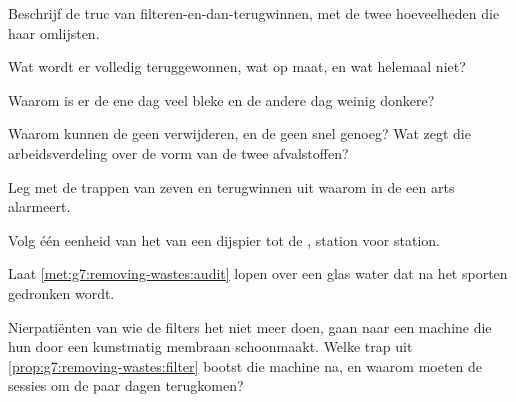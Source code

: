 \begin{exercise}[$\star$]\label{exo:g7:removing-wastes:4}
Beschrijf de truc van filteren-en-dan-terugwinnen, met de twee
hoeveelheden die haar omlijsten.
\end{exercise}

\begin{exercise}[$\star$]\label{exo:g7:removing-wastes:5}
Wat wordt er volledig teruggewonnen, wat op maat, en wat helemaal niet?
\end{exercise}

\begin{exercise}[$\star$]\label{exo:g7:removing-wastes:6}
Waarom is er de ene dag veel bleke  en de andere dag weinig donkere?
\end{exercise}

\begin{exercise}[$\star\star$]\label{exo:g7:removing-wastes:7}
Waarom kunnen de  geen  verwijderen, en de  geen
 snel genoeg? Wat zegt die arbeidsverdeling over de vorm
van de twee afvalstoffen?
\end{exercise}

\begin{exercise}[$\star\star$]\label{exo:g7:removing-wastes:8}
Leg met de trappen van zeven en terugwinnen uit waarom  in de 
een arts alarmeert.
\end{exercise}

\begin{exercise}[$\star\star$]\label{exo:g7:removing-wastes:9}
Volg één eenheid  van het  van een dijspier tot de ,
station voor station.
\end{exercise}

\begin{exercise}[$\star\star$]\label{exo:g7:removing-wastes:10}
Laat \cref{met:g7:removing-wastes:audit} lopen over een glas water dat na
het sporten gedronken wordt.
\end{exercise}

\begin{exercise}[$\star\star$]\label{exo:g7:removing-wastes:11}
Nierpatiënten van wie de filters het niet meer doen, gaan naar een machine
die hun  door een kunstmatig membraan schoonmaakt. Welke trap uit
\cref{prop:g7:removing-wastes:filter} bootst die machine na, en waarom
moeten de sessies om de paar dagen terugkomen?
\end{exercise}

